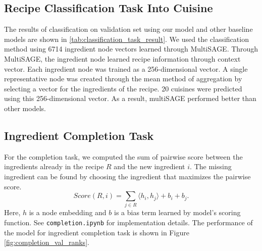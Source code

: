  \subsection{Recipe Classification Task Into Cuisine}

 \begin{table}[btp!]
    \centering
    \caption{\label{tab:classification_task_result} Performance measured by \{Micro/Macro\} F1-score and accuracy of each model in validation classification set.}

 \end{table}
 
  The results of classification on validation set using our model and other baseline models are shown in \autoref{tab:classification_task_result}.  
  We used the classification method using 6714 ingredient node vectors learned through MultiSAGE. Through MultiSAGE, the ingredient node learned recipe information through context vector. Each ingredient node was trained as a 256-dimensional vector. A single representative node was created through the mean method of aggregation by selecting a vector for the ingredients of the recipe. 20 cuisines were predicted using this 256-dimensional vector. As a result, multiSAGE performed better than other models.
  
 \subsection{Ingredient Completion Task}
 For the completion task, we computed the sum of pairwise score between the ingredients already in the recipe $R$ and the new ingredient $i$. The missing ingredient can be found by choosing the ingredient that maximizes the pairwise score.
 \begin{equation}
     Score(R, i) = \sum_{j \in R} \langle h_i, h_j \rangle + b_i + b_j.
 \end{equation}
 Here, $h$ is a node embedding and $b$ is a bias term learned by model's scoring function. See \texttt{completion.ipynb} for implementation details. The performance of the model for ingredient completion task is shown in Figure \autoref{fig:completion_val_ranks}.

